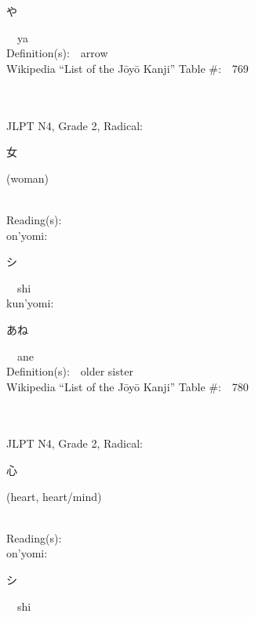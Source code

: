 \begin{multicols}{2}
{\hspace*{2em}}{\begin{CJK}{UTF8}{min} や \end{CJK}}\ \ ya\ \ \\
Definition(s):\ \ arrow \\
Wikipedia ``List of the J\=oy\=o Kanji'' Table \#:\ \ 769 \\
\ \ \\
{\fontsize{34pt}{40pt}  }\ \ \\  %
{JLPT N4, Grade 2, Radical:\ \ {\begin{CJK}{UTF8}{min} 女 \end{CJK}} (woman) } \\
Reading(s):\ \ \\
{\hspace*{1em}}on'yomi:\ \ \\
{\hspace*{2em}}{\begin{CJK}{UTF8}{min} シ \end{CJK}}\ \ shi\ \ \\
{\hspace*{1em}}kun'yomi:\ \ \\
{\hspace*{2em}}{\begin{CJK}{UTF8}{min} あね \end{CJK}}\ \ ane\ \ \\
Definition(s):\ \ older sister \\
Wikipedia ``List of the J\=oy\=o Kanji'' Table \#:\ \ 780 \\
\ \ \\
{\fontsize{34pt}{40pt}  }\ \ \\  %
{JLPT N4, Grade 2, Radical:\ \ {\begin{CJK}{UTF8}{min} 心 \end{CJK}} (heart, heart/mind) } \\
Reading(s):\ \ \\
{\hspace*{1em}}on'yomi:\ \ \\
{\hspace*{2em}}{\begin{CJK}{UTF8}{min} シ \end{CJK}}\ \ shi\ \ \\

\end{multicols}

